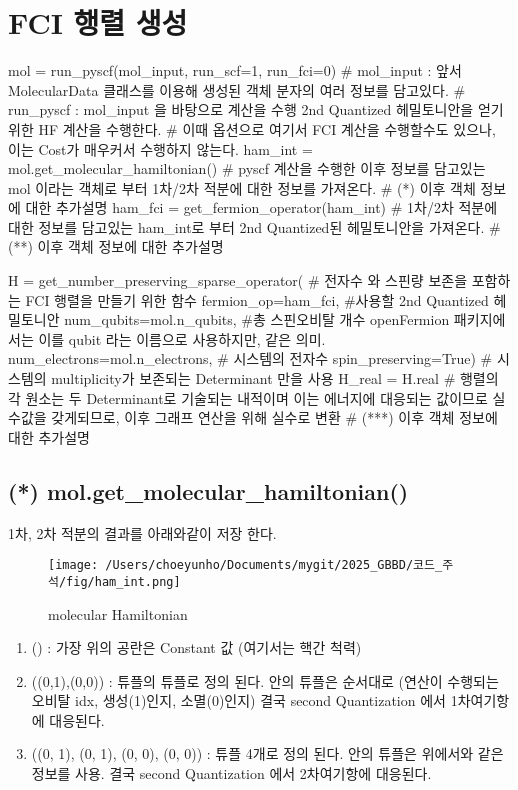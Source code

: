 \documentclass[11pt]{article}
\begin{document}
\section{FCI 행렬 생성}
\begin{CodeBox}[title={Example: Python snippet}]
mol = run_pyscf(mol_input, run_scf=1, run_fci=0)
# mol_input : 앞서 MolecularData 클래스를 이용해 생성된 객체 분자의 여러 정보를 담고있다. 
# run_pyscf : mol_input 을 바탕으로 계산을 수행 2nd Quantized 헤밀토니안을 얻기위한 HF 계산을 수행한다. 
# 이때 옵션으로 여기서 FCI 계산을 수행할수도 있으나, 이는 Cost가 매우커서 수행하지 않는다. 
ham_int = mol.get_molecular_hamiltonian()
# pyscf 계산을 수행한 이후 정보를 담고있는 mol 이라는 객체로 부터 1차/2차 적분에 대한 정보를 가져온다. 
# (*) 이후 객체 정보에 대한 추가설명
ham_fci = get_fermion_operator(ham_int)
# 1차/2차 적분에 대한 정보를 담고있는 ham_int로 부터 2nd Quantized된 헤밀토니안을 가져온다. 
# (**) 이후 객체 정보에 대한 추가설명 

H = get_number_preserving_sparse_operator(
# 전자수 와 스핀량 보존을 포함하는 FCI 행렬을 만들기 위한 함수
fermion_op=ham_fci, #사용할 2nd Quantized 헤밀토니안
num_qubits=mol.n_qubits, #총 스핀오비탈 개수 openFermion 패키지에서는 이를 qubit 라는 이름으로 사용하지만, 같은 의미.
num_electrons=mol.n_electrons,  # 시스템의 전자수 
spin_preserving=True)        # 시스템의 multiplicity가 보존되는 Determinant 만을 사용
H_real = H.real # 행렬의 각 원소는 두 Determinant로 기술되는 내적이며 이는 에너지에 대응되는 값이므로 실수값을 갖게되므로, 이후 그래프 연산을 위해 실수로 변환
# (***) 이후 객체 정보에 대한 추가설명 
\end{CodeBox}
\newpage
\subsection{(*) mol.get\_molecular\_hamiltonian()}
1차, 2차 적분의 결과를 아래와같이 저장 한다. 
\begin{figure}[H]
    \centering
    \texttt{[image: /Users/choeyunho/Documents/mygit/2025\_GBBD/코드\_주석/fig/ham\_int.png]}
    \caption{molecular Hamiltonian}
    \label{fig:my_image}
\end{figure}
\begin{enumerate}[label=\textbf{*}, leftmargin=*]
  \item () : 가장 위의 공란은 Constant 값 (여기서는 핵간 척력) 
  \item ((0,1),(0,0)) : 튜플의 튜플로 정의 된다. 안의 튜플은 순서대로 (연산이 수행되는 오비탈 idx, 생성(1)인지, 소멸(0)인지) 결국 second Quantization 에서 1차여기항에 대응된다. 
  \item ((0, 1), (0, 1), (0, 0), (0, 0)) : 튜플 4개로 정의 된다. 안의 튜플은 위에서와 같은 정보를 사용. 결국 second Quantization 에서 2차여기항에 대응된다. 
\end{enumerate}
\end{document}
